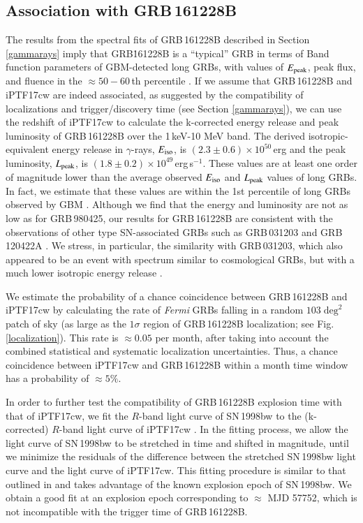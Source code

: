 \documentclass[twocolumn]{emulateapj}
\begin{document}
\subsection{Association with GRB\,161228B}
The results from the spectral fits of GRB\,161228B described in Section \ref{gammarays} imply that GRB\.161228B is a ``typical'' GRB in terms of  Band function parameters of GBM-detected long 
GRBs, with values of $E_{\rm peak}$, peak flux, and fluence in the $\approx 50-60$\,th percentile \citep{Gruber2014}.  If we assume that GRB\,161228B and iPTF17cw are indeed associated, as suggested by the compatibility of localizations and trigger/discovery time (see Section \ref{gammarays}), we can use the redshift of iPTF17cw to calculate the k-corrected 
energy release and peak luminosity of GRB\,161228B over the 1\,keV-10 MeV band.  The derived isotropic-equivalent energy release in $\gamma$-rays, $E_{\rm iso}$, is $(2.3\pm0.6)\times10^{50}$\,erg and the peak luminosity, $L_{\rm peak}$, is $(1.8\pm0.2)\times10^{49}$\,erg\,s$^{-1}$.  These values 
are at least one order of magnitude lower than the average observed $E_{\rm iso}$ and $L_{\rm peak}$ values of long GRBs.  In fact, we 
estimate that these values are within the 1st percentile of long GRBs observed by GBM \citep{Gruber2014}.  Although we find that the energy and luminosity are not 
as low as for GRB\,980425, our results for GRB\,161228B are consistent with the observations of other type SN-associated GRBs such as GRB\,031203 \citep{Soderberg2004} and GRB\,120422A  \citep{Melandri2012}. We stress, in particular, the similarity with GRB\,031203, which also appeared to be an event with spectrum similar to cosmological GRBs, but with a much lower isotropic energy release \citep{Sazonov2004}. 

We estimate the probability of a chance coincidence between GRB\,161228B and iPTF17cw by calculating the rate of \textit{Fermi} GRBs falling in a random $103\deg^2$ 
patch of sky (as large as the $1\sigma$ region of GRB\,161228B localization; see Fig. \ref{localization}). This  rate is $\approx 0.05$ per month, after taking into account the combined statistical and systematic localization uncertainties. Thus, a chance coincidence between iPTF17cw and GRB\,161228B within a month time window has a probability of $\approx 5\%$.

In order to further test the compatibility of GRB\,161228B explosion time with that of iPTF17cw, we fit the $R$-band light curve of SN\,1998bw to the (k-corrected) $R$-band light curve
of iPTF17cw \citep[for more details, see][]{Taddia2017}. In the fitting process, we allow the light curve  of SN\,1998bw to be stretched in time and shifted in magnitude, until we minimize the residuals of the difference between the stretched SN\,1998bw light curve and the light curve of iPTF17cw. This fitting procedure is similar to that outlined in \citet{Cano2013} and takes advantage of the known explosion epoch of SN\,1998bw. 
We obtain a good fit at an explosion epoch corresponding to $\approx$ MJD 57752, which is not incompatible with the trigger time of GRB\,161228B.
\end{document}
